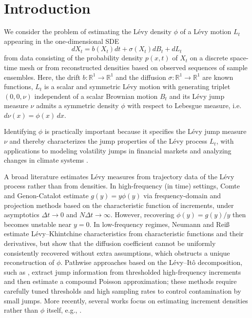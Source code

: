 \documentclass[12pt]{article}
\numberwithin{equation}{section}
\numberwithin{theorem}{section}
\begin{document}
\section{Introduction}
\label{Introduction}
We consider the problem of estimating the  L\'evy density $\phi$ of a L\'evy motion $L_t$ appearing in the one-dimensional SDE
\begin{equation}
\label{eq:SDE}
d X_t=b\left(X_{t}\right) d t+ \sigma\left(X_{t}\right) d B_t+d L_t 
\end{equation}
from data consisting of the probability density $p(x,t)$ of $X_t$ on a discrete space-time mesh or from reconstructed densities based on observed sequences of sample ensembles. 
Here, the drift $b: \mathbb{R}^1 \rightarrow \mathbb{R}^1$ and the diffusion $\sigma: \mathbb{R}^1 \rightarrow \mathbb{R}^1$ are known functions, $L_t$ is a scalar and symmetric L\'evy motion with generating triplet $(0,0, \nu)$ independent of a scalar Brownian motion $B_t$ and its L\'evy jump measure $\nu$ admits a symmetric density $\phi$ with respect to Lebesgue measure, i.e. $d\nu(x) = \phi(x)\,dx$.

Identifying $\phi$ is practically important because it specifies the L\'evy jump measure $\nu$ and thereby characterizes the jump properties of the L\'evy process $L_t$, with applications to modeling volatility jumps in financial markets \cite{yu2011mcmc, kindermann2008identification, applebaum2009levy} and analyzing changes in climate systems \cite{zheng2020maximum, li2022extracting}.

A broad literature estimates L\'evy measures from trajectory data of the L\'evy process rather than from densities. In high-frequency (in time) settings, Comte and Genon-Catalot \cite{comte2009nonparametric} estimate $g(y)=y\phi(y)$ via frequency-domain and projection methods based on the characteristic function of increments, under asymptotics $\Delta t\to 0$ and $N\Delta t\to\infty$. However, recovering $\phi(y)=g(y)/y$ then becomes unstable near $y=0$.  
In low-frequency regimes, Neumann and Reiß \cite{neumann2009} estimate L\'evy–Khintchine characteristics from characteristic functions and their derivatives, but show that the diffusion coefficient cannot be uniformly consistently recovered without extra assumptions, which obstructs a unique reconstruction of $\phi$. Pathwise approaches based on the L\'evy–Itô decomposition, such as \cite{duval2021spectral}, extract jump information from thresholded high-frequency increments and then estimate a compound Poisson approximation; these methods require carefully tuned thresholds and high sampling rates to control contamination by small jumps. More recently, several works focus on estimating increment densities rather than $\phi$ itself, e.g., \cite{duval2024adaptive,duval2025nonparametric}. 
\end{document}
